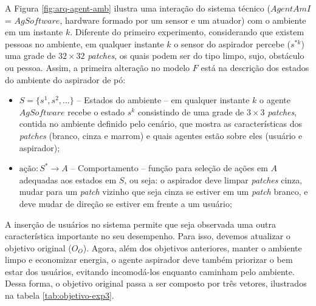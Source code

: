 A Figura \ref{fig:arq-agent-amb} ilustra uma interação do sistema técnico ($AgentAmI$ = $AgSoftware$, hardware formado por um sensor e um atuador) com o ambiente em um instante $k$. Diferente do primeiro experimento, considerando que existem pessoas no ambiente, em qualquer instante $k$ o sensor do aspirador percebe ($s^{*k}$) uma grade de $32 \times 32$ \textit{patches}, os quais podem ser do tipo limpo, sujo, obstáculo ou pessoa. Assim, a primeira alteração no modelo $F$ está na descrição dos estados do ambiente do aspirador de pó:

\begin{itemize}
    \item $S = \{s^1, s^2, \ldots\}$ --	Estados do ambiente – em qualquer instante $k$ o agente $AgSoftware$ recebe o estado $s^k$ consistindo de uma grade de $3\times3$ \textit{patches}, contida no ambiente definido pelo cenário, que mostra as características dos \textit{patches} (branco, cinza e marrom) e quais agentes estão sobre eles (usuário e aspirador);
    
    \item $\textrm{ação} : S^*  \rightarrow A$ -- Comportamento – função para seleção de ações em $A$ adequadas aos estados em $S$, ou seja: o aspirador deve limpar \textit{patches} cinza, mudar para um \textit{patch} vizinho que seja cinza se estiver em um \textit{patch} branco, e deve mudar de direção se estiver em frente a um usuário;
    
\end{itemize}

A inserção de usuários no sistema permite que seja observada uma outra característica importante no seu desempenho. Para isso, devemos atualizar o objetivo original ($O_O$). Agora, além dos objetivos anteriores, manter o ambiente limpo e economizar energia, o agente aspirador deve também priorizar o bem estar dos usuários, evitando incomodá-los enquanto caminham pelo ambiente. Dessa forma, o objetivo original passa a ser composto por três vetores, ilustrados na tabela \ref{tab:objetivo-exp3}.

\begin{table}[h!]   
    \centering
\end{table}

